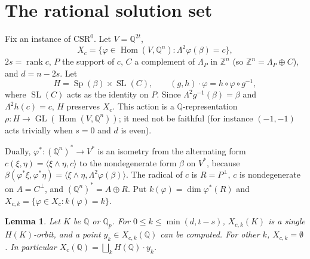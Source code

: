 \documentclass[11pt]{amsart}
\newtheorem{lemma}[theorem]{Lemma}
\theoremstyle{definition}
\theoremstyle{remark}
\newcommand{\Z}{\mathbb{Z}}
\newcommand{\Q}{\mathbb{Q}}
\newcommand{\Qp}{\mathbb{Q}_p}
\newcommand{\w}{\wedge}
\newcommand{\Hom}{\operatorname{Hom}}
\newcommand{\Sp}{\operatorname{Sp}}
\newcommand{\SL}{\operatorname{SL}}
\newcommand{\GL}{\operatorname{GL}}
\newcommand{\rank}{\operatorname{rank}}
\begin{document}
\section{The rational solution set}\label{sec:orbits}

Fix an instance of $\mathrm{CSR}^0$. Let $V=\Q^{2t}$,
\[X_c=\{\varphi\in\Hom(V,\Q^n):\Lambda^2\varphi(\beta)=c\},\]
$2s=\rank c$, $P$ the support of $c$, $C$ a complement of $\Lambda_P$ in $\Z^n$
(so $\Z^n=\Lambda_P\oplus C$), and $d=n-2s$. Let
\[H=\Sp(\beta)\times\SL(C),\qquad (g,h)\cdot\varphi=h\circ\varphi\circ g^{-1},\]
where $\SL(C)$ acts as the identity on $P$. Since $\Lambda^2g^{-1}(\beta)=\beta$ and
$\Lambda^2h(c)=c$, $H$ preserves $X_c$. This action is a $\Q$-representation
$\rho\colon H\to\GL(\Hom(V,\Q^n))$; it need not be faithful (for instance
$(-1,-1)$ acts trivially when $s=0$ and $d$ is even).

Dually, $\varphi^*\colon(\Q^n)^*\to V^*$ is an isometry from the alternating form
$c(\xi,\eta)=\langle\xi\w\eta,c\rangle$ to the nondegenerate form $\beta$ on $V^*$,
because $\beta(\varphi^*\xi,\varphi^*\eta)=\langle\xi\w\eta,\Lambda^2\varphi(\beta)\rangle$.
The radical of $c$ is $R=P^\perp$, $c$ is nondegenerate on $A=C^\perp$, and
$(\Q^n)^*=A\oplus R$. Put $k(\varphi)=\dim\varphi^*(R)$ and
$X_{c,k}=\{\varphi\in X_c:k(\varphi)=k\}$.

\begin{lemma}\label{lem:orbits}
Let $K$ be $\Q$ or $\Qp$. For $0\le k\le\min(d,t-s)$, $X_{c,k}(K)$ is a single
$H(K)$-orbit, and a point $y_k\in X_{c,k}(\Q)$ can be computed. For other $k$,
$X_{c,k}=\emptyset$. In particular $X_c(\Q)=\bigsqcup_kH(\Q)\cdot y_k$.
\end{lemma}
\end{document}
